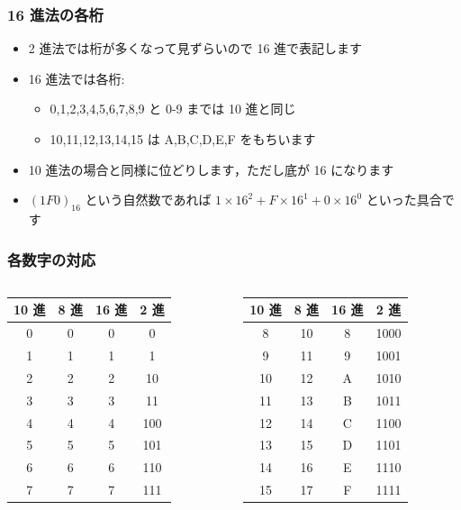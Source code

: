 \begin{frame}
\frametitle{16 進法の各桁}
  \begin{itemize}
\item 2 進法では桁が多くなって見ずらいので 16 進で表記します
\item 16 進法では各桁:
    \begin{itemize}
\item 0,1,2,3,4,5,6,7,8,9 と 0-9 までは 10 進と同じ
\item 10,11,12,13,14,15 は A,B,C,D,E,F をもちいます
    \end{itemize}
\item 10 進法の場合と同様に位どりします，ただし底が 16 になります
\item \((1F0)_{16}\) という自然数であれば \(1\times 16^2+F\times 16^1+0\times 16^0\) といった具合です
  \end{itemize}
\end{frame}
\begin{frame}
\frametitle{各数字の対応}
  \begin{columns}[t]
    \begin{column}{5cm}
\footnotesize
      \begin{tabular}{c|c|c|c}
10 進 & 8 進 & 16 進 & 2 進\\
\hline
 0& 0& 0&0\\
 1& 1& 1&1\\
 2& 2& 2&10\\
 3& 3& 3&11\\
 4& 4& 4&100\\
 5& 5& 5&101\\
 6& 6& 6&110\\
 7& 7& 7&111\\
      \end{tabular}
    \end{column}
    \begin{column}{5cm}
\footnotesize
      \begin{tabular}{c|c|c|c}
10 進 & 8 進 & 16 進 & 2 進\\
\hline
 8&10& 8&1000\\
 9&11& 9&1001\\
10&12& A&1010\\
11&13& B&1011\\
12&14& C&1100\\
13&15& D&1101\\
14&16& E&1110\\
15&17& F&1111\\
      \end{tabular}
    \end{column}
  \end{columns}
\end{frame}
